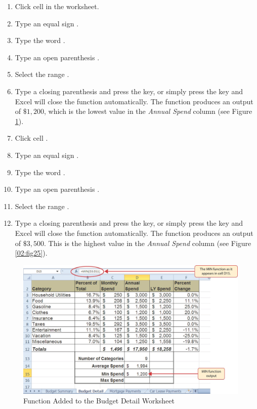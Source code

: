 \begin{enumerate}
	\item Click cell  in the  worksheet.
	\item Type an equal sign \fmtTyping{=}.
	\item Type the word .
	\item Type an open parenthesis \fmtTyping{(}.
	\item Select the range .
	\item Type a closing parenthesis \fmtTyping{)} and press the  key, or simply press the  key and Excel will close the function automatically. The  function produces an output of $ \$1,200 $, which is the lowest value in the \textit{Annual Spend} column (see Figure \ref{02:fig24}).
	\item Click cell .
	\item Type an equal sign \fmtTyping{=}.
	\item Type the word .
	\item Type an open parenthesis \fmtTyping{(}.
	\item Select the range .
	\item Type a closing parenthesis \fmtTyping{)} and press the  key, or simply press the  key and Excel will close the function automatically. The  function produces an output of $ \$3,500 $. This is the highest value in the \textit{Annual Spend} column (see Figure \ref{02:fig25}).
\end{enumerate}

\begin{figure}[H]
	\centering
	\includegraphics[width=\maxwidth{.95\linewidth}]{gfx/ch02_fig24}
	\caption{ Function Added to the Budget Detail Worksheet}
	\label{02:fig24}
\end{figure}


